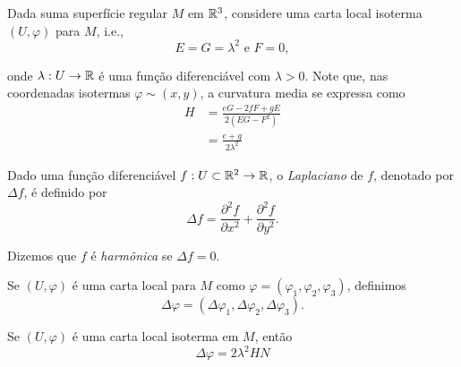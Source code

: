 Dada suma superfície regular $M$ em $\mathbb{R}^3$, considere uma carta local isoterma $(U,\varphi)$ para $M$, i.e., 
\begin{equation*}
	E = G = \lambda^2 \text{ e } F=0,
\end{equation*}

onde $\lambda: U \rightarrow \mathbb{R}$ é uma função diferenciável com $\lambda > 0$. Note que, nas coordenadas isotermas $\varphi \sim (x,y)$, a curvatura media se expressa como
\begin{align*}
	H &= \frac{eG - 2fF + gE}{2(EG - F^2)}\\
	&= \frac{e + g}{2 \lambda^2}
\end{align*}

\begin{definicao}
	Dado uma função diferenciável $f: U \subset \mathbb{R}^2 \rightarrow \mathbb{R}$, o \emph{Laplaciano} de $f$, denotado por $\Delta f$, é definido por
	\begin{equation*}
		\Delta f = \frac{\partial^2 f}{\partial x^2} + \frac{\partial^2 f}{\partial y^2}.
	\end{equation*}
	
	Dizemos que $f$ é \emph{harmônica} se $\Delta f = 0$.
	
	Se $(U, \varphi)$ é uma carta local para $M$ como $\varphi = (\varphi_1, \varphi_2, \varphi_3)$, definimos
	\begin{equation*}
		\Delta \varphi = (\Delta \varphi_1, \Delta \varphi_2, \Delta \varphi_3).
	\end{equation*}
\end{definicao}

\begin{proposicao}
	Se $(U, \varphi)$ é uma carta local isoterma em $M$, então 
	\begin{equation*}
		\Delta \varphi = 2 \lambda^2 H N
	\end{equation*}
\end{proposicao}

